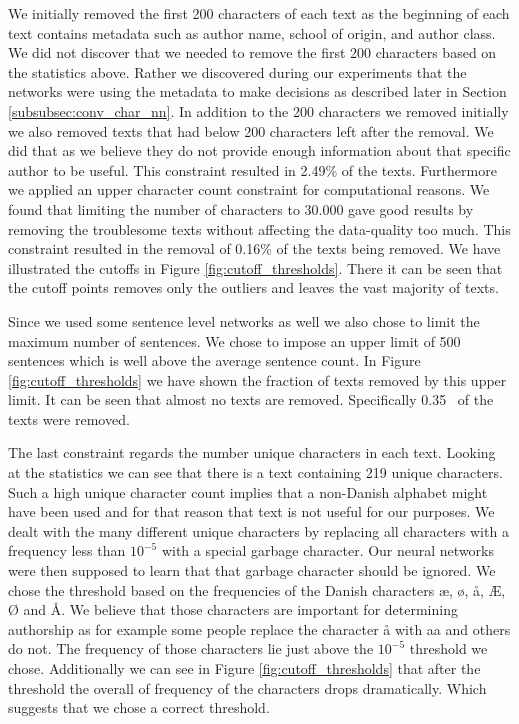 We initially removed the first 200 characters of each text as the beginning
of each text contains metadata such as author name, school of origin, and
author class. We did not discover that we needed to remove the first 200
characters based on the statistics above. Rather we discovered during our
experiments that the networks were using the metadata to make decisions as
described later in Section \ref{subsubsec:conv_char_nn}. In addition to the
200 characters we removed initially we also removed texts that had below 200
characters left after the removal. We did that as we believe they do not provide
enough information about that specific author to be useful. This constraint
resulted in 2.49\% of the texts. Furthermore we applied an upper character count
constraint for computational reasons. We found that limiting the number of
characters to 30.000 gave good results by removing the troublesome texts without
affecting the data-quality too much. This constraint resulted in the removal of
0.16\% of the texts being removed. We have illustrated the cutoffs in Figure
\ref{fig:cutoff_thresholds}. There it can be seen that the cutoff points removes
only the outliers and leaves the vast majority of texts.

Since we used some sentence level networks as well we also chose to limit
the maximum number of sentences. We chose to impose an upper limit of
500 sentences which is well above the average sentence count. In Figure
\ref{fig:cutoff_thresholds} we have shown the fraction of texts removed by this
upper limit. It can be seen that almost no texts are removed. Specifically 0.35
\textperthousand\ of the texts were removed.

The last constraint regards the number unique characters in each text. Looking
at the statistics we can see that there is a text containing 219 unique
characters. Such a high unique character count implies that a non-Danish
alphabet might have been used and for that reason that text is not useful for
our purposes. We dealt with the many different unique characters by replacing
all characters with a frequency less than $10^{-5}$ with a special garbage
character. Our neural networks were then supposed to learn that that garbage
character should be ignored. We chose the threshold based on the frequencies
of the Danish characters æ, ø, å, Æ, Ø and Å. We believe that those
characters are important for determining authorship as for example some people
replace the character å with aa and others do not. The frequency of those
characters lie just above the $10^{-5}$ threshold we chose. Additionally we can
see in Figure \ref{fig:cutoff_thresholds} that after the threshold the overall
of frequency of the characters drops dramatically. Which suggests that we chose
a correct threshold.

